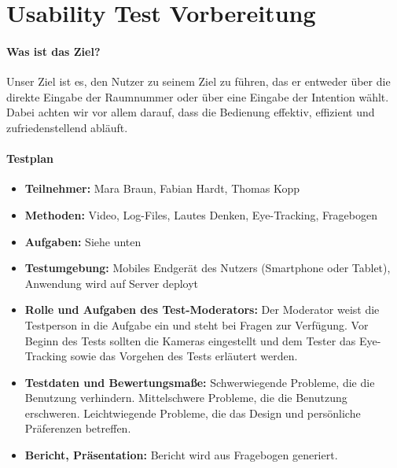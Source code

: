 \chapter{Usability Test Vorbereitung}

\subsubsection*{Was ist das Ziel?}
Unser Ziel ist es, den Nutzer zu seinem Ziel zu führen, das er entweder über die direkte Eingabe der Raumnummer oder über eine Eingabe der Intention wählt.
Dabei achten wir vor allem darauf, dass die Bedienung effektiv, effizient und zufriedenstellend abläuft.
\subsubsection*{Testplan}
\begin{itemize}
\item \textbf{Teilnehmer:} Mara Braun, Fabian Hardt, Thomas Kopp
\item \textbf{Methoden:} Video, Log-Files, Lautes Denken, Eye-Tracking, Fragebogen
\item \textbf{Aufgaben:} Siehe unten
\item \textbf{Testumgebung:} Mobiles Endgerät des Nutzers (Smartphone oder Tablet), Anwendung wird auf Server deployt
\item \textbf{Rolle und Aufgaben des Test-Moderators:} Der Moderator weist die Testperson in die Aufgabe ein und steht bei Fragen zur Verfügung. Vor Beginn des Tests sollten die Kameras eingestellt und dem Tester das Eye-Tracking sowie das Vorgehen des Tests erläutert werden.
\item \textbf{Testdaten und Bewertungsmaße:} Schwerwiegende Probleme, die die Benutzung verhindern. Mittelschwere Probleme, die die Benutzung erschweren. Leichtwiegende Probleme, die das Design und persönliche Präferenzen betreffen.
\item \textbf{Bericht, Präsentation:} Bericht wird aus Fragebogen generiert.

\end{itemize}
